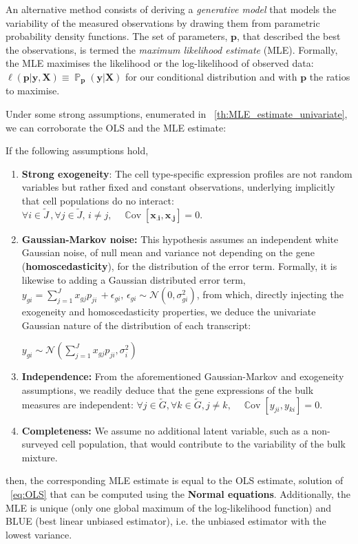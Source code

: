 \documentclass[long, final]{jobim}
\DeclareMathOperator*{\prob}{\mathbb{P}}
\DeclareMathOperator*{\cov}{\mathbb{C}\text{ov}}
\newcommand \CC [1]{\cov\left[{#1}\right]}
\begin{document}
An alternative method consists of deriving a \textit{generative model} that models the variability of the measured observations by drawing them from parametric probability density functions. The set of parameters, $\boldsymbol{p}$, that described the best the observations, is termed the \textit{maximum likelihood estimate} (MLE). Formally, the MLE maximises the likelihood or the log-likelihood of observed data: $\ell(\boldsymbol{p}|\boldsymbol{y}, \boldsymbol{X}) \equiv \prob_{\boldsymbol{p}}(\boldsymbol{y}|\boldsymbol{X})$ for our conditional distribution and with $\boldsymbol{p}$ the ratios to maximise. 

Under some strong assumptions, enumerated in \theoremname~\ref{th:MLE_estimate_univariate}, we can corroborate the OLS and the MLE estimate:

\begin{theorem}
If the following assumptions hold,
\begin{enumerate}
    \item \textbf{Strong exogeneity}: The cell type-specific expression profiles are not random variables but rather fixed and constant observations, underlying implicitly that cell populations do no interact:
  \(\forall i \in \widetilde{J} \, ,  \forall j \in \widetilde{J}, \, i \neq j, \quad \CC{\boldsymbol{x_{.i}}, \boldsymbol{x_{.j}}}=0\).
  \item \textbf{Gaussian-Markov noise:} This hypothesis assumes an independent white Gaussian noise, of null mean and variance not depending on the gene (\textbf{homoscedasticity}), for the distribution of the error term. Formally, it is likewise to adding a Gaussian distributed error term, $y_{gi} = \sum_{j=1}^J  x_{gj}p_{ji} \, + \epsilon_{gi}, \, \epsilon_{gi} \sim \mathcal{N} \left(0, \sigma_{gi}^2\right)$, from which, directly injecting the exogeneity and homoscedasticity properties, we deduce the univariate Gaussian nature of the distribution of each transcript:
  
  $y_{gi} \sim \mathcal{N} \left(\sum_{j=1}^J  x_{gj}p_{ji}, \sigma_{i}^2 \right)$ 
  \item \textbf{Independence:} From the aforementioned Gaussian-Markov and exogeneity assumptions, we readily deduce that the gene expressions of the bulk measures are independent: \(\forall j \in \widetilde{G}, \forall k \in \widetilde{G}, j \neq k, \quad  \CC{y_{ji}, y_{ki}}=0\).
  \item \textbf{Completeness:} We assume no additional latent variable, such as a non-surveyed cell population, that would contribute to the variability of the bulk mixture.
\end{enumerate}
then, the corresponding MLE estimate is equal to the OLS estimate, solution of \equationname ~\ref{eq:OLS} that can be computed using the \textbf{Normal equations}. Additionally, the MLE is unique (only one global maximum of the log-likelihood function) and BLUE (best linear unbiased estimator), i.e. the unbiased estimator with the lowest variance.
\label{th:MLE_estimate_univariate}    
\end{theorem}
\end{document}
